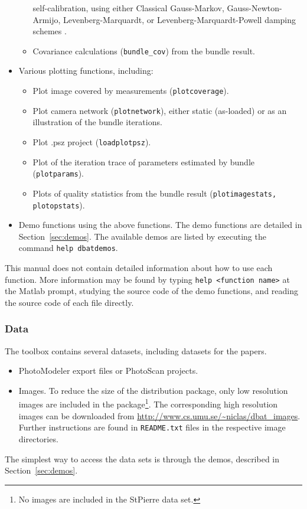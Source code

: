 \documentclass{article}
\begin{document}
\begin{itemize}
\begin{itemize}
    self-calibration, using either Classical Gauss-Markov,
    Gauss-Newton-Armijo, Levenberg-Marquardt, or
    Levenberg-Marquardt-Powell damping schemes
    \citep{Borlin2013:Bundle,Borlin2014:Camera,Borlin2016:External}.
  \item Covariance calculations (\texttt{bundle\_cov}) from the bundle
    result.
  \end{itemize}
\item Various plotting functions, including:
  \begin{itemize}
  \item Plot image covered by measurements
    (\texttt{plotcoverage}).
  \item Plot camera network (\texttt{plotnetwork}), either static
    (as-loaded) or as an illustration of the bundle iterations.
  \item Plot .psz project (\texttt{loadplotpsz}).
  \item Plot of the iteration trace of parameters estimated by bundle
    (\texttt{plotparams}).
  \item Plots of quality statistics from the bundle result
    (\texttt{plotimagestats, plotopstats}).
  \end{itemize}
\item Demo functions using the above functions. The demo functions are
  detailed in Section~\ref{sec:demos}. The available demos are listed
  by executing the command \texttt{help dbatdemos}.
\end{itemize}

This manual does not contain detailed information about how to use
each function. More information may be found by typing \texttt{help
  <function name>} at the Matlab prompt, studying the source code of
the demo functions, and reading the source code of each file directly.

\subsubsection{Data}

The toolbox contains several datasets, including datasets for the
\citet{Borlin2016:External,Murtiyoso2017:Reprocessing} papers.
\begin{itemize}
\item PhotoModeler export files or PhotoScan projects.
\item Images. To reduce the size of the distribution package, only low
  resolution images are included in the package\footnote{No images are
    included in the StPierre data set.}. The corresponding high
  resolution images can be downloaded from
  \url{http://www.cs.umu.se/~niclas/dbat_images}. Further instructions
  are found in \texttt{README.txt} files in the respective image
  directories.
\end{itemize}
The simplest way to access the data sets is through the demos,
described in Section~\ref{sec:demos}.
\end{document}
